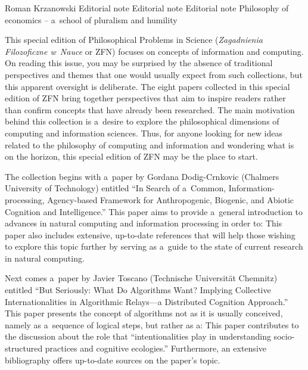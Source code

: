 
\begin{editorialeng}{Roman Krzanowski}
	{Editorial note}
	{Editorial note}
	{Editorial note}
	{Philosophy of economics -- a~school of pluralism and humility}


\lettrine[loversize=0.13,lines=2,lraise=-0.03,nindent=0em,findent=0.2pt]%
{T}{}his special edition of Philosophical Problems in Science (\textit{Zagadnienia Filozoficzne w~Nauce} or ZFN) focuses on concepts of information and computing. On reading this issue, you may be surprised by the absence of traditional perspectives and themes that one would usually expect from such collections, but this apparent oversight is deliberate. The eight papers collected in this special edition of ZFN bring together perspectives that aim to inspire readers rather than confirm concepts that have already been researched. The main motivation behind this collection is a~desire to explore the philosophical dimensions of computing and information sciences. Thus, for anyone looking for new ideas related to the philosophy of computing and information and wondering what is on the horizon, this special edition of ZFN may be the place to start.

The collection begins with a~paper by Gordana Dodig-Crnkovic (Chalmers University of Technology) entitled ``In Search of a~Common, Information-processing, Agency-based Framework for Anthropogenic, Biogenic, and Abiotic Cognition and Intelligence.'' This paper aims to provide a~general introduction to advances in natural computing and information processing in order to:
This paper also includes extensive, up-to-date references that will help those wishing to explore this topic further by serving as a~guide to the state of current research in natural computing.

Next comes a~paper by Javier Toscano (Technische Universität Chemnitz) entitled ``But Seriously: What Do Algorithms Want? Implying Collective Internationalities in Algorithmic Relays---a Distributed Cognition Approach.'' This paper presents the concept of algorithms not as it is usually conceived, namely as a~sequence of logical steps, but rather as a:
This paper contributes to the discussion about the role that ``intentionalities play in understanding socio-structured practices and cognitive ecologies.'' Furthermore, an extensive bibliography offers up-to-date sources on the paper's topic.


\end{editorialeng}
